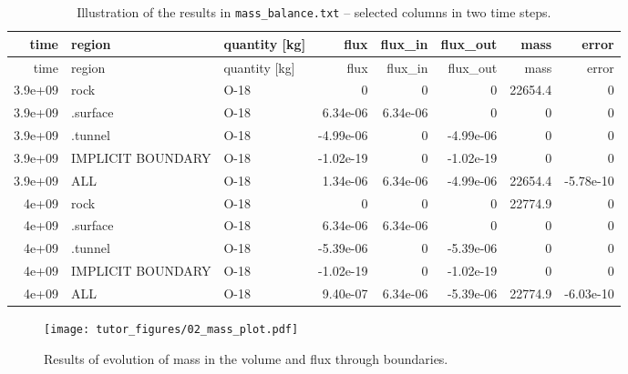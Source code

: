 \begin{longtable}[c]{@{}rllrrrrr@{}}
\caption{Illustration of the results in \texttt{mass\_balance.txt} --
selected columns in two time steps.
\label{tbl:mass_balance}}\tabularnewline
\toprule
time & region & quantity {[}kg{]} & flux & flux\_in & flux\_out & mass &
error\tabularnewline
\midrule
\endfirsthead
\toprule
time & region & quantity {[}kg{]} & flux & flux\_in & flux\_out & mass &
error\tabularnewline
\midrule
\endhead
3.9e+09 & rock & O-18 & 0 & 0 & 0 & 22654.4 & 0\tabularnewline
3.9e+09 & .surface & O-18 & 6.34e-06 & 6.34e-06 & 0 & 0 &
0\tabularnewline
3.9e+09 & .tunnel & O-18 & -4.99e-06 & 0 & -4.99e-06 & 0 &
0\tabularnewline
3.9e+09 & IMPLICIT BOUNDARY & O-18 & -1.02e-19 & 0 & -1.02e-19 & 0 &
0\tabularnewline
3.9e+09 & ALL & O-18 & 1.34e-06 & 6.34e-06 & -4.99e-06 & 22654.4 &
-5.78e-10\tabularnewline
4e+09 & rock & O-18 & 0 & 0 & 0 & 22774.9 & 0\tabularnewline
4e+09 & .surface & O-18 & 6.34e-06 & 6.34e-06 & 0 & 0 & 0\tabularnewline
4e+09 & .tunnel & O-18 & -5.39e-06 & 0 & -5.39e-06 & 0 &
0\tabularnewline
4e+09 & IMPLICIT BOUNDARY & O-18 & -1.02e-19 & 0 & -1.02e-19 & 0 &
0\tabularnewline
4e+09 & ALL & O-18 & 9.40e-07 & 6.34e-06 & -5.39e-06 & 22774.9 &
-6.03e-10\tabularnewline
\bottomrule
\end{longtable}

\begin{figure}[htbp]
\centering
\texttt{[image: tutor\_figures/02\_mass\_plot.pdf]}
\caption{Results of evolution of mass in the volume and flux through
boundaries.\label{fig:mass_plot}}
\end{figure}
